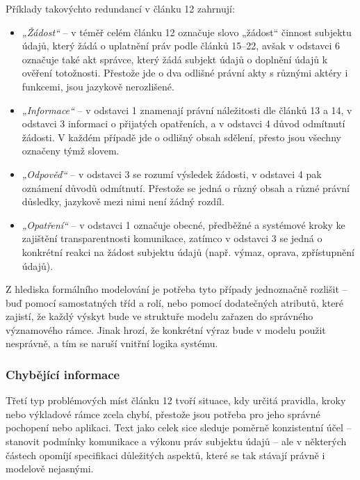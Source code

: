 Příklady takovýchto redundancí v článku 12 zahrnují:
\begin{itemize}
  \item \textit{„Žádost“} – v téměř celém článku 12 označuje slovo „žádost“ činnost subjektu údajů, který žádá o uplatnění práv podle článků 15–22, avšak v odstavci 6 označuje také akt správce, který žádá subjekt údajů o doplnění údajů k ověření totožnosti. Přestože jde o dva odlišné právní akty s různými aktéry i funkcemi, jsou jazykově nerozlišené.
  \item \textit{„Informace“} – v odstavci 1 znamenají právní náležitosti dle článků 13 a 14, v odstavci 3 informaci o přijatých opatřeních, a v odstavci 4 důvod odmítnutí žádosti. V každém případě jde o odlišný obsah sdělení, přesto jsou všechny označeny týmž slovem.
  \item \textit{„Odpověď“} – v odstavci 3 se rozumí výsledek žádosti, v odstavci 4 pak oznámení důvodů odmítnutí. Přestože se jedná o různý obsah a různé právní důsledky, jazykově mezi nimi není žádný rozdíl.
  \item \textit{„Opatření“} – v odstavci 1 označuje obecné, předběžné a systémové kroky ke zajištění transparentnosti komunikace, zatímco v odstavci 3 se jedná o konkrétní reakci na žádost subjektu údajů (např. výmaz, oprava, zpřístupnění údajů).
\end{itemize}

\noindent Z hlediska formálního modelování je potřeba tyto případy jednoznačně rozlišit – buď pomocí samostatných tříd a rolí, nebo pomocí dodatečných atributů, které zajistí, že každý výskyt bude ve struktuře modelu zařazen do správného významového rámce. Jinak hrozí, že konkrétní výraz bude v modelu použit nesprávně, a tím se naruší vnitřní logika systému.
 

\subsubsection{Chybějící informace}
\label{sec:chybejici-informace}
Třetí typ problémových míst článku 12 tvoří situace, kdy určitá pravidla, kroky nebo výkladové rámce zcela chybí, přestože jsou potřeba pro jeho správné pochopení nebo aplikaci. Text jako celek sice sleduje poměrně konzistentní účel – stanovit podmínky komunikace a výkonu práv subjektu údajů – ale v některých částech opomíjí specifikaci důležitých aspektů, které se tak stávají právně i modelově nejasnými.


